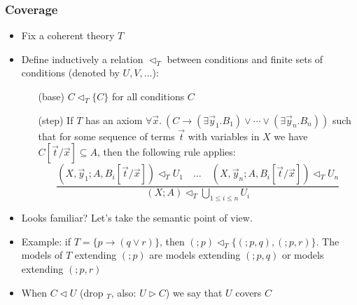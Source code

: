 \documentclass[handout,11pt]{beamer}
\newcommand{\set}[1]{\{#1\}}
\newcommand{\covd}{\mathrel{\vartriangleleft}}
\newcommand{\covs}{\mathrel{\vartriangleright}}
\newcommand{\covT}{\mathrel{\vartriangleleft_T}}
\begin{document}
\begin{frame}
\frametitle{Coverage}
 \begin{itemize}[<+->]   %
  \item Fix a coherent theory $T$
  \item Define inductively a relation $\covT$ between
  conditions and finite sets of conditions (denoted by $U,V,...$):    
   \begin{enumerate}
    \item[(base)] $C\covT\set{C}$ for all conditions $C$
    \item[(step)] If $T$ has an axiom $\forall\vec{x}.~
    (C \to (\exists\vec{y}_1.B_1) \lor \cdots \lor (\exists\vec{y}_n.B_n))$
    such that for some sequence of terms $\vec{t}$ with variables in $X$
    we have $C[\vec{t}/\vec{x}] \subseteq A$, then the following rule applies:   
\[
\frac{(X,\vec y_1; A,B_i[\vec{t}/\vec{x}]) \covT U_1 \quad \ldots
\quad (X,\vec y_n; A,B_i[\vec{t}/\vec{x}]) \covT U_n}
{(X;A) \covT \bigcup_{1\leq i\leq n} U_i}
\]
   \end{enumerate}
  \item Looks familiar? Let's take the semantic point of view.
  \item Example: if $T=\set{p\to(q\lor r)}$, 
  then $(;p)\covT\set{(;p,q),(;p,r)}$. The models of $T$ extending $(;p)$ are
  models extending $(;p,q)$ or models extending $(;p,r)$
  \item When $C \covd U$ (drop ${}_T$, also: $U \covs C$) 
  we say that $U$ covers $C$ 
 \end{itemize}
\end{frame}
\end{document}
